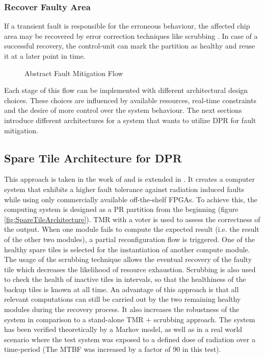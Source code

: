 \subsubsection{Recover Faulty Area}
    If a transient fault is responsible for the erroneous behaviour, the affected chip area may be recovered by error correction techniques like scrubbing \cite{reorda_error-detection_2017}. 
    In case of a successful recovery, the control-unit can mark the partition as healthy and reuse it at a later point in time.
\begin{center}
\begin{figure}[h]
    \centering
    \resizebox{\smallColumnWidth}{!} {
        
    }
\caption{Abstract Fault Mitigation Flow}
\label{fig:internalFaultFlow}
\end{figure}
\end{center}
Each stage of this flow can be implemented with different architectural design choices.
These choices are influenced by available resources, real-time constraints and the desire of more control over the system behaviour.
The next sections introduce different architectures for a system that wants to utilize \gls{DPR} for fault mitigation.

\subsection{Spare Tile Architecture for \gls{DPR}}
This approach is taken in the work of \cite{lameres_radsat_nodate} and is extended in \cite{wilson_hybrid_2017}.
It creates a computer system that exhibits a higher fault tolerance against radiation induced faults while using only commercially available off-the-shelf \glspl{FPGA}. 
To achieve this, the computing system is designed as a \gls{PR} partition from the beginning (figure \ref{fig:SpareTileArchitecture}). 
\gls{TMR} with a voter is used to assess the correctness of the output. 
When one module fails to compute the expected result (i.e. the result of the other two modules), a partial reconfiguration flow is triggered.
One of the healthy spare tiles is selected for the instantiation of another compute module.
The usage of the scrubbing technique allows the eventual recovery of the faulty tile which decreases the likelihood of resource exhaustion. 
Scrubbing is also used to check the health of inactive tiles in intervals, so that the healthiness of the backup tiles is known at all time. 
An advantage of this approach is that all relevant computations can still be carried out by the two remaining healthy modules during the recovery process. 
It also increases the robustness of the system in comparison to a stand-alone \gls{TMR} + scrubbing approach.
The system has been verified theoretically by a Markov model, as well as in a real world scenario where the test system was exposed to a defined dose of radiation over a time-period (The \gls{MTBF} was increased by a factor of 90 in this test).

